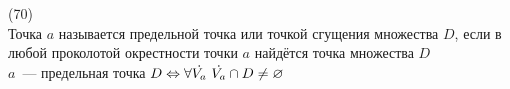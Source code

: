 (70)\\
Точка $a$ называется предельной точка или точкой сгущения множества $D$, если в любой проколотой окрестности точки $a$ найдётся точка множества $D$\\
$a$~--- предельная точка $D \lra \forall \dot{V_a}\ \dot{V_a} \cap D \neq \varnothing$